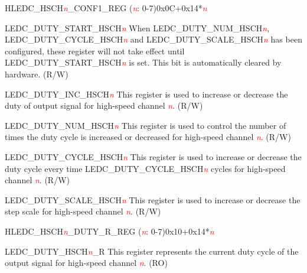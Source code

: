 \begin{register}{H}{LEDC\_HSCH\textcolor{red}{\it{n}}\_CONF1\_REG (\textcolor{red}{\it{n}}: 0-7)}{0x0C+0x14*\textcolor{red}{\it{n}}}\label{regdesc:LEDCHSCHnCONF1REG}
%
%
%
%
%
\regnewline%
\begin{regdesc}\begin{reglist}
\item [LEDC\_DUTY\_START\_HSCH\textcolor{red}{\it{n}}]When LEDC\_DUTY\_NUM\_HSCH\textcolor{red}{\it{n}}, LEDC\_DUTY\_CYCLE\_HSCH\textcolor{red}{\it{n}} and LEDC\_DUTY\_SCALE\_HSCH\textcolor{red}{\it{n}} has been configured, these register will not take effect until LEDC\_DUTY\_START\_HSCH\textcolor{red}{\it{n}} is set. This bit is automatically cleared by hardware. (R/W)
\item [LEDC\_DUTY\_INC\_HSCH\textcolor{red}{\it{n}}]This register is used to increase or decrease the duty of output signal for high-speed channel \textcolor{red}{\it{n}}. (R/W)
\item [LEDC\_DUTY\_NUM\_HSCH\textcolor{red}{\it{n}}]This register is used to control the number of times the duty cycle is increased or decreased for high-speed channel \textcolor{red}{\it{n}}. (R/W)
\item [LEDC\_DUTY\_CYCLE\_HSCH\textcolor{red}{\it{n}}]This register is used to increase or decrease the duty cycle every time LEDC\_DUTY\_CYCLE\_HSCH\textcolor{red}{\it{n}} cycles for high-speed channel \textcolor{red}{\it{n}}. (R/W)
\item [LEDC\_DUTY\_SCALE\_HSCH\textcolor{red}{\it{n}}]This register is used to increase or decrease the step scale for high-speed channel \textcolor{red}{\it{n}}. (R/W)
\end{reglist}\end{regdesc}
\end{register}


\begin{register}{H}{LEDC\_HSCH\textcolor{red}{\it{n}}\_DUTY\_R\_REG (\textcolor{red}{\it{n}}: 0-7)}{0x10+0x14*\textcolor{red}{\it{n}}}\label{regdesc:LEDCHSCHnDUTYRREG}
%
%
\regnewline%
\begin{regdesc}\begin{reglist}
\item [LEDC\_DUTY\_HSCH\textcolor{red}{\it{n}}\_R]This register represents the current duty cycle of the output signal for high-speed channel \textcolor{red}{\it{n}}. (RO)
\end{reglist}\end{regdesc}
\end{register}


